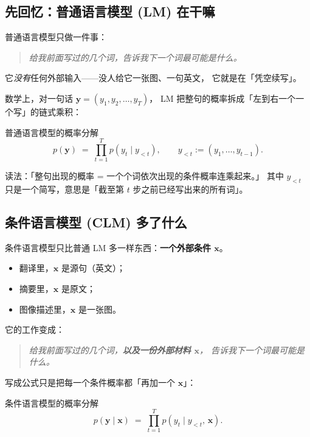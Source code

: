 \documentclass[11pt,a4paper]{ctexart}
\newcommand{\vect}[1]{\boldsymbol{#1}}
\begin{document}
\subsection{先回忆：普通语言模型 (LM) 在干嘛}

\begin{intuitionblock}
普通语言模型只做一件事：

\begin{quote}
\textit{给我前面写过的几个词，告诉我下一个词最可能是什么。}
\end{quote}

它\emph{没有}任何外部输入——没人给它一张图、一句英文，
它就是在「凭空续写」。
\end{intuitionblock}

数学上，对一句话 $\vect{y} = (y_1, y_2, \dots, y_T)$，
LM 把整句的概率拆成「左到右一个一个写」的链式乘积：

\begin{mathbox}{普通语言模型的概率分解}
\[
  p(\vect{y}) \;=\; \prod_{t=1}^{T} p(y_t \mid y_{<t}),
  \qquad y_{<t} := (y_1, \dots, y_{t-1}).
\]
\end{mathbox}

读法：「整句出现的概率 = 一个个词依次出现的条件概率连乘起来。」
其中 $y_{<t}$ 只是一个简写，意思是「截至第 $t$ 步之前已经写出来的所有词」。

\subsection{条件语言模型 (CLM) 多了什么}

\begin{intuitionblock}
条件语言模型只比普通 LM 多一样东西：\textbf{一个外部条件 $\vect{x}$}。
\begin{itemize}
  \item 翻译里，$\vect{x}$ 是源句（英文）；
  \item 摘要里，$\vect{x}$ 是原文；
  \item 图像描述里，$\vect{x}$ 是一张图。
\end{itemize}

它的工作变成：

\begin{quote}
\textit{给我前面写过的几个词，\textbf{以及一份外部材料 $\vect{x}$}，
告诉我下一个词最可能是什么。}
\end{quote}
\end{intuitionblock}

写成公式只是把每一个条件概率都「再加一个 $\vect{x}$」：

\begin{mathbox}{条件语言模型的概率分解}
\[
  p(\vect{y} \mid \vect{x}) \;=\; \prod_{t=1}^{T} p(y_t \mid y_{<t},\, \vect{x}).
\]
\end{mathbox}
\end{document}
